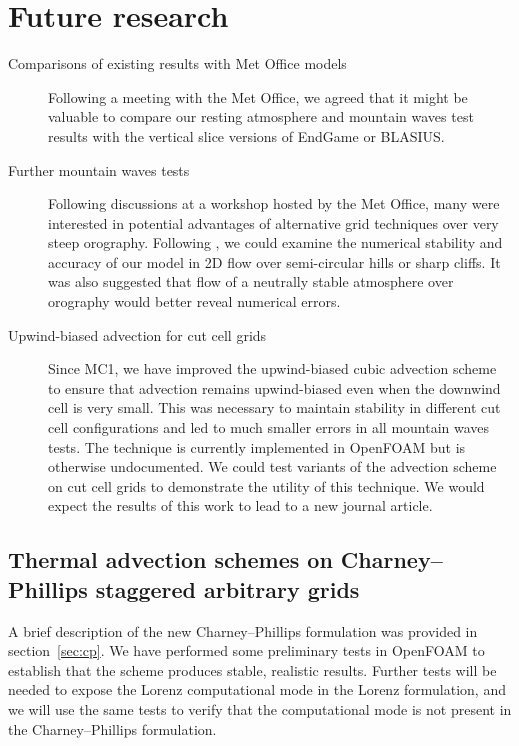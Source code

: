 \documentclass[a4paper]{article}
\begin{document}
\section{Future research}




\begin{description}
	\item[Comparisons of existing results with Met Office models]{Following a meeting with the Met Office, we agreed that it might be valuable to compare our resting atmosphere and mountain waves test results with the vertical slice versions of EndGame or BLASIUS.}
	\item[Further mountain waves tests]{Following discussions at a workshop hosted by the Met Office, many were interested in potential advantages of alternative grid techniques over very steep orography.  Following \citet{yamazaki-satomura2010}, we could examine the numerical stability and accuracy of our model in 2D flow over semi-circular hills or sharp cliffs.  It was also suggested that flow of a neutrally stable atmosphere over orography would better reveal numerical errors.}
	\item[Upwind-biased advection for cut cell grids]{Since MC1, we have improved the upwind-biased cubic advection scheme to ensure that advection remains upwind-biased even when the downwind cell is very small.  This was necessary to maintain stability in different cut cell configurations and led to much smaller errors in all mountain waves tests.  The technique is currently implemented in OpenFOAM but is otherwise undocumented.  We could test variants of the advection scheme on cut cell grids to demonstrate the utility of this technique.  We would expect the results of this work to lead to a new journal article.}
\end{description}

\subsection*{Thermal advection schemes on Charney--Phillips staggered arbitrary grids}
A brief description of the new Charney--Phillips formulation was provided in section~\ref{sec:cp}.  We have performed some preliminary tests in OpenFOAM to establish that the scheme produces stable, realistic results.  Further tests will be needed to expose the Lorenz computational mode in the Lorenz formulation, and we will use the same tests to verify that the computational mode is not present in the Charney--Phillips formulation.
		
\end{document}
